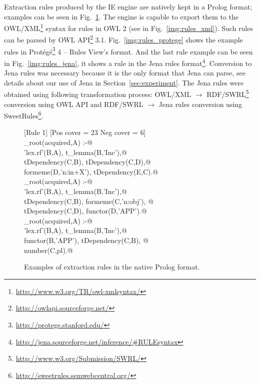 \documentclass[10pt, conference, compsocconf]{IEEEtran}
\begin{document}
Extraction rules produced by the IE engine are natively kept in a Prolog format; examples can be seen in Fig.~\ref{img:rules_prolog}. The engine is capable to export them to the OWL/XML\footnote{\url{http://www.w3.org/TR/owl-xmlsyntax/}} syntax for rules in OWL 2 \cite{GHPP09a} (see in Fig.~\ref{img:rules_xml}). Such rules can be parsed by OWL API\footnote{\url{http://owlapi.sourceforge.net/}} 3.1. Fig.~\ref{img:rules_protege} shows the example rules in Prot\'{e}g\'{e}\footnote{\url{http://protege.stanford.edu/}} 4 -- Rules View's format. And the last rule example can be seen in Fig.~\ref{img:rules_jena}, it shows a rule in the Jena rules format\footnote{\url{http://jena.sourceforge.net/inference/#RULEsyntax}}. Conversion to Jena rules was necessary because it is the only format that Jena can parse, see details about our use of Jena in Section~\ref{sec:experiment}. The Jena rules were obtained using following transformation process: OWL/XML $\rightarrow$ RDF/SWRL\footnote{\url{http://www.w3.org/Submission/SWRL/}} conversion using OWL API and RDF/SWRL $\rightarrow$ Jena rules conversion using SweetRules\footnote{\url{http://sweetrules.semwebcentral.org/}}.



\begin{figure}
\small
[Rule 1] [Pos cover = 23 Neg cover = 6]\\
\verb@mention_root(acquired,A) :-@\\
\verb@   'lex.rf'(B,A), t_lemma(B,'Inc'),@\\
\verb@   tDependency(C,B), tDependency(C,D),@\\
\verb@   formeme(D,'n:in+X'), tDependency(E,C).@
\smallskip\newline
[Rule 11] [Pos cover = 25 Neg cover = 6]\\
\verb@mention_root(acquired,A) :-@\\
\verb@   'lex.rf'(B,A), t_lemma(B,'Inc'),@\\
\verb@   tDependency(C,B), formeme(C,'n:obj'), @\\
\verb@   tDependency(C,D), functor(D,'APP').@
\smallskip\newline
[Rule 75] [Pos cover = 14 Neg cover = 1]\\
\verb@mention_root(acquired,A) :-@\\
\verb@   'lex.rf'(B,A), t_lemma(B,'Inc'),@\\
\verb@   functor(B,'APP'), tDependency(C,B), @\\
\verb@   number(C,pl).@
	\caption{Examples of extraction rules in the native Prolog format.}
	\label{img:rules_prolog}
\end{figure}
\end{document}
